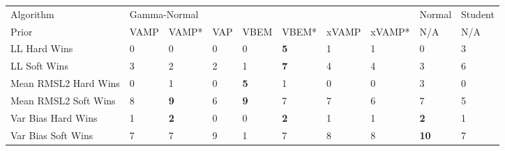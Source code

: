\begin{tabular}{llllllllll}
\toprule
Algorithm & \multicolumn{7}{l}{Gamma-Normal} &       Normal & Student \\
Prior &         VAMP &       VAMP* & VAP &        VBEM &       VBEM* & xVAMP & xVAMP* &          N/A &     N/A \\
\midrule
LL Hard Wins         &            0 &           0 &   0 &           0 &  \textbf{5} &     1 &      1 &            0 &       3 \\
LL Soft Wins         &            3 &           2 &   2 &           1 &  \textbf{7} &     4 &      4 &            3 &       6 \\
Mean RMSL2 Hard Wins &            0 &           1 &   0 &  \textbf{5} &           1 &     0 &      0 &            3 &       0 \\
Mean RMSL2 Soft Wins &            8 &  \textbf{9} &   6 &  \textbf{9} &           7 &     7 &      6 &            7 &       5 \\
Var Bias Hard Wins   &            1 &  \textbf{2} &   0 &           0 &  \textbf{2} &     1 &      1 &   \textbf{2} &       1 \\
Var Bias Soft Wins   &            7 &           7 &   9 &           1 &           7 &     8 &      8 &  \textbf{10} &       7 \\
\bottomrule
\end{tabular}

